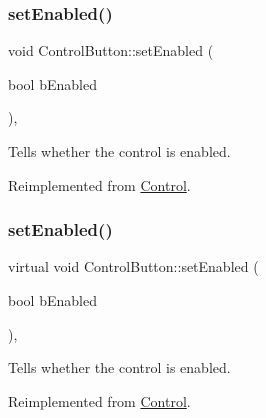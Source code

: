 \mbox{\label{classControlButton_ab8b40e3ef7dccccc2b2029c5ae113962}} 
\subsubsection{\texorpdfstring{set\+Enabled()}{setEnabled()}\hspace{0.1cm}{\footnotesize\ttfamily [1/2]}}
{\footnotesize\ttfamily void Control\+Button\+::set\+Enabled (\begin{DoxyParamCaption}\item[{bool}]{b\+Enabled }\end{DoxyParamCaption})\hspace{0.3cm}{\ttfamily [override]}, {\ttfamily [virtual]}}

Tells whether the control is enabled. 

Reimplemented from \hyperlink{classControl_a55339ae920182245d5ec114c33f4b1fd}{Control}.

\mbox{\label{classControlButton_ac3515c2c94586676696d73d48e5ab08f}} 
\subsubsection{\texorpdfstring{set\+Enabled()}{setEnabled()}\hspace{0.1cm}{\footnotesize\ttfamily [2/2]}}
{\footnotesize\ttfamily virtual void Control\+Button\+::set\+Enabled (\begin{DoxyParamCaption}\item[{bool}]{b\+Enabled }\end{DoxyParamCaption})\hspace{0.3cm}{\ttfamily [override]}, {\ttfamily [virtual]}}

Tells whether the control is enabled. 

Reimplemented from \hyperlink{classControl_a55339ae920182245d5ec114c33f4b1fd}{Control}.

\mbox{\label{classControlButton_a463166812b3c42d952264855e2aa3b1d}} 
